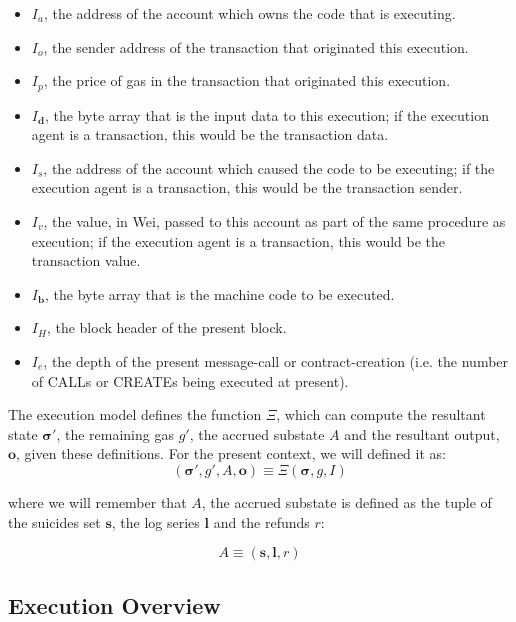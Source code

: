 \documentclass[9pt,oneside]{amsart}
\begin{document}
\begin{multicols}{2}
\begin{itemize}
\item $I_a$, the address of the account which owns the code that is executing.
\item $I_o$, the sender address of the transaction that originated this execution.
\item $I_p$, the price of gas in the transaction that originated this execution.
\item $I_\mathbf{d}$, the byte array that is the input data to this execution; if the execution agent is a transaction, this would be the transaction data.
\item $I_s$, the address of the account which caused the code to be executing; if the execution agent is a transaction, this would be the transaction sender.
\item $I_v$, the value, in Wei, passed to this account as part of the same procedure as execution; if the execution agent is a transaction, this would be the transaction value.
\item $I_\mathbf{b}$, the byte array that is the machine code to be executed.
\item $I_H$, the block header of the present block.
\item $I_e$, the depth of the present message-call or contract-creation (i.e. the number of {\small CALL}s or {\small CREATE}s being executed at present).
\end{itemize}

The execution model defines the function $\Xi$, which can compute the resultant state $\boldsymbol{\sigma}'$, the remaining gas $g'$, the accrued substate $A$ and the resultant output, $\mathbf{o}$, given these definitions. For the present context, we will defined it as:
\begin{equation}
(\boldsymbol{\sigma}', g', A, \mathbf{o}) \equiv \Xi(\boldsymbol{\sigma}, g, I)
\end{equation}

where we will remember that $A$, the accrued substate is defined as the tuple of the suicides set $\mathbf{s}$, the log series $\mathbf{l}$ and the refunds $r$:

\begin{equation}
A \equiv (\mathbf{s}, \mathbf{l}, r)
\end{equation}

\subsection{Execution Overview}


\end{multicols}
\end{document}
